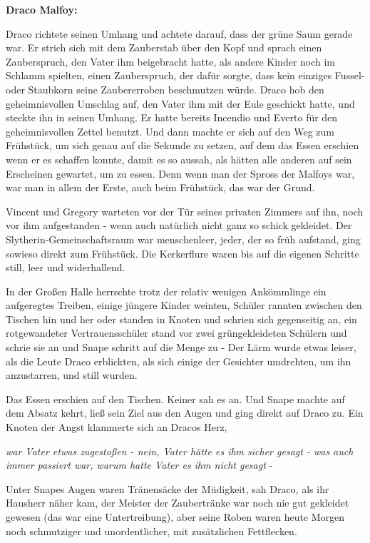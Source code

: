 {\textbf{Draco Malfoy:}

Draco richtete seinen Umhang und achtete darauf, dass der grüne Saum gerade war. Er strich sich mit dem Zauberstab über den Kopf und sprach einen Zauberspruch, den Vater ihm beigebracht hatte, als andere Kinder noch im Schlamm spielten, einen Zauberspruch, der dafür sorgte, dass kein einziges Fussel- oder Staubkorn seine Zaubererroben beschmutzen würde. Draco hob den geheimnisvollen Umschlag auf, den Vater ihm mit der Eule geschickt hatte, und steckte ihn in seinen Umhang. Er hatte bereits Incendio und Everto für den geheimnisvollen Zettel benutzt. Und dann machte er sich auf den Weg zum Frühstück, um sich genau auf die Sekunde zu setzen, auf dem das Essen erschien wenn er es schaffen konnte, damit es so aussah, als hätten alle anderen auf sein Erscheinen gewartet, um zu essen. Denn wenn man der Spross der Malfoys war, war man in allem der Erste, auch beim Frühstück, das war der Grund.

Vincent und Gregory warteten vor der Tür seines privaten Zimmers auf ihn, noch vor ihm aufgestanden - wenn auch natürlich nicht ganz so schick gekleidet. Der Slytherin-Gemeinschaftsraum war menschenleer, jeder, der so früh aufstand, ging sowieso direkt zum Frühstück. Die Kerkerflure waren bis auf die eigenen Schritte still, leer und widerhallend.

In der Großen Halle herrschte trotz der relativ wenigen Ankömmlinge ein aufgeregtes Treiben, einige jüngere Kinder weinten, Schüler rannten zwischen den Tischen hin und her oder standen in Knoten und schrien sich gegenseitig an, ein rotgewandeter Vertrauensschüler stand vor zwei grüngekleideten Schülern und schrie sie an und Snape schritt auf die Menge zu - Der Lärm wurde etwas leiser, als die Leute Draco erblickten, als sich einige der Gesichter umdrehten, um ihn anzustarren, und still wurden.

Das Essen erschien auf den Tischen. Keiner sah es an. Und Snape machte auf dem Absatz kehrt, ließ sein Ziel aus den Augen und ging direkt auf Draco zu. Ein Knoten der Angst klammerte sich an Dracos Herz,

\emph{war Vater etwas zugestoßen - nein, Vater hätte es ihm sicher gesagt - was auch immer passiert war, warum hatte Vater es ihm nicht gesagt} -

Unter Snapes Augen waren Tränensäcke der Müdigkeit, sah Draco, als ihr Hausherr näher kam, der Meister der Zaubertränke war noch nie gut gekleidet gewesen (das war eine Untertreibung), aber seine Roben waren heute Morgen noch schmutziger und unordentlicher, mit zusätzlichen Fettflecken.

}
